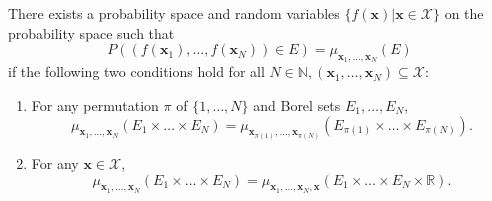 \begin{theorem}
    There exists a probability space and random variables $\{ f(\mathbf{x}) | \mathbf{x} \in \mathcal{X} \}$ 
    on the probability space such that
    \begin{equation*}
        P((f(\mathbf{x}_1), \dots, f(\mathbf{x}_N)) \in E) = \mu_{\mathbf{x}_1, \dots, \mathbf{x}_N}(E)
    \end{equation*}
    if the following two conditions hold for all $N \in \mathbb{N}, (\mathbf{x}_1, \dots, \mathbf{x}_N) \subseteq \mathcal{X}$:
    \begin{enumerate}
        \item For any permutation $\pi$ of $\{ 1, \dots, N \}$ and Borel sets $E_1, \dots, E_N$,
            \begin{equation*}
                \mu_{\mathbf{x}_1, \dots, \mathbf{x}_N}(E_1 \times \dots \times E_N)
                =\mu_{\mathbf{x}_{\pi(1)}, \dots, \mathbf{x}_{\pi(N)}}\left(E_{\pi(1)} \times \dots \times E_{\pi(N)}\right).
            \end{equation*}
        \item For any $\mathbf{x} \in \mathcal{X}$,
            \begin{equation*}
                \mu_{\mathbf{x}_1, \dots, \mathbf{x}_N}(E_1 \times \dots \times E_N)
                =
                \mu_{\mathbf{x}_1, \dots, \mathbf{x}_N, \mathbf{x}}(E_1 \times \dots \times E_N \times \mathbb{R}).
            \end{equation*}
    \end{enumerate}
\end{theorem}

